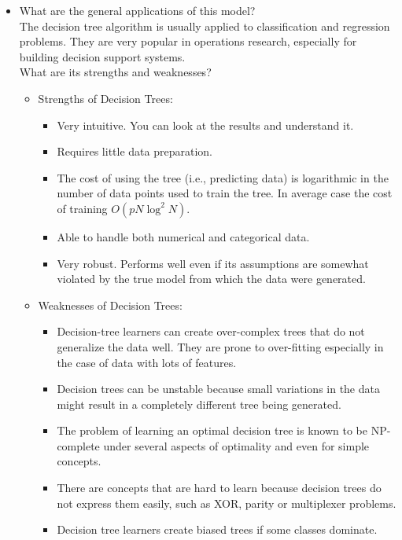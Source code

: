 \documentclass[12pt]{article}
\begin{document}
\begin{itemize}
\item What are the general applications of this model?\\
The decision tree algorithm is usually applied to classification and regression problems. They are very popular in operations research, especially for building decision support systems. \\
What are its strengths and weaknesses?\\  
       \begin{itemize}
       \item Strengths of Decision Trees:
              \begin{itemize}[noitemsep,nolistsep]
                     \item Very intuitive. You can look at the results and understand it. 
                     \item Requires little data preparation. 
                     \item The cost of using the tree (i.e., predicting data) is logarithmic in the number of data points used to train the tree. In average case the cost of training $ O(pN\log^2 N)$.
                     \item Able to handle both numerical and categorical data.
                     \item Very robust. Performs well even if its assumptions are somewhat violated by the true model from which the data were generated.
              \end{itemize}
       \item Weaknesses of Decision Trees:
              \begin{itemize}[noitemsep,nolistsep]
                     \item Decision-tree learners can create over-complex trees that do not generalize the data well. They are prone to over-fitting especially in the case of data with lots of features.
                     \item Decision trees can be unstable because small variations in the data might result in a completely different tree being generated. 
                     \item The problem of learning an optimal decision tree is known to be NP-complete under several aspects of optimality and even for simple concepts. 
                     \item There are concepts that are hard to learn because decision trees do not express them easily, such as XOR, parity or multiplexer problems.
                     \item Decision tree learners create biased trees if some classes dominate. 
              \end{itemize}
       \end{itemize}



\end{itemize}
\end{document}
